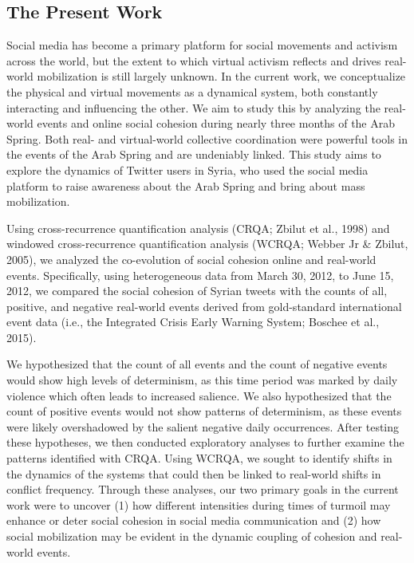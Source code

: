 \documentclass[english,man]{apa6}
\begin{document}
\hypertarget{the-present-work}{%
\subsection{The Present Work}\label{the-present-work}}

Social media has become a primary platform for social movements and activism
across the world, but the extent to which virtual activism reflects and drives
real-world mobilization is still largely unknown. In the current work, we
conceptualize the physical and virtual movements as a dynamical system, both
constantly interacting and influencing the other. We aim to study this by
analyzing the real-world events and online social cohesion during nearly three
months of the Arab Spring. Both real- and virtual-world collective coordination
were powerful tools in the events of the Arab Spring and are undeniably linked.
This study aims to explore the dynamics of Twitter users in Syria, who used the
social media platform to raise awareness about the Arab Spring and bring about
mass mobilization.

Using cross-recurrence quantification analysis (CRQA; Zbilut et al., 1998) and
windowed cross-recurrence quantification analysis (WCRQA; Webber Jr \& Zbilut, 2005), we analyzed the co-evolution of social cohesion online
and real-world events. Specifically, using heterogeneous data from March 30,
2012, to June 15, 2012, we compared the social cohesion of Syrian tweets with
the counts of all, positive, and negative real-world events derived from
gold-standard international event data (i.e., the Integrated Crisis Early
Warning System; Boschee et al., 2015).

We hypothesized that the count of all events and the count of negative events
would show high levels of determinism, as this time period was marked by daily
violence which often leads to increased salience. We also hypothesized that the
count of positive events would not show patterns of determinism, as these events
were likely overshadowed by the salient negative daily occurrences. After
testing these hypotheses, we then conducted exploratory analyses to further
examine the patterns identified with CRQA. Using WCRQA, we sought to identify
shifts in the dynamics of the systems that could then be linked to real-world
shifts in conflict frequency. Through these analyses, our two primary goals in
the current work were to uncover (1) how different intensities during times of
turmoil may enhance or deter social cohesion in social media communication and
(2) how social mobilization may be evident in the dynamic coupling of cohesion
and real-world events.
\end{document}
